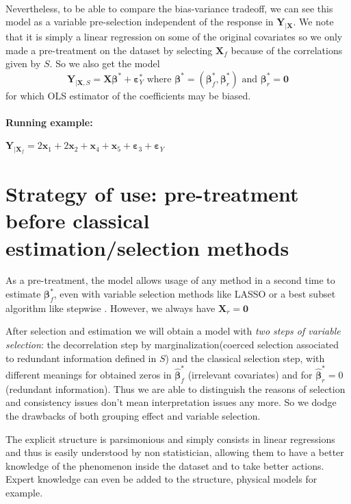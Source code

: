 \documentclass[12pt,a4paper]{report}
\begin{document}
\\
Nevertheless, to be able to compare the bias-variance tradeoff, we can see this model as a variable pre-selection independent of the response in $\boldsymbol{Y}_{|\boldsymbol{X}}$.
We note that it is simply a linear regression on some of the original covariates so we only made a pre-treatment on the dataset by selecting $\boldsymbol{X}_f$ because of the correlations given by $S$. So we also get the model
\begin{equation}
\boldsymbol{Y}_{|\boldsymbol{X},S}=\boldsymbol{X}\boldsymbol{\beta}^*+\boldsymbol{\varepsilon}_Y^* \textrm{ where }\boldsymbol{\beta}^*=(\boldsymbol{\beta}_f^*,\boldsymbol{\beta}_r^*) \textrm{ and } \boldsymbol{\beta}_r^*=\boldsymbol{0}
\end{equation}
	for which OLS estimator of the coefficients may be biased.  

\paragraph{Running example:} $\boldsymbol{Y}_{|\boldsymbol{X}_f}= 2\boldsymbol{x}_1+2\boldsymbol{x}_2+\boldsymbol{x}_4+\boldsymbol{x}_5+\boldsymbol{\varepsilon}_3 +\boldsymbol{\varepsilon}_Y$
\section{Strategy of use: pre-treatment before classical estimation/selection methods}\label{interpretation}

As a pre-treatment, the model allows usage of any method in a second time to estimate $\boldsymbol{\beta}_f^*$, even with variable selection methods like LASSO or a best subset algorithm like stepwise \cite{seber2012linear}. However, we always have $\boldsymbol{X}_r=\boldsymbol{0}$

After selection and estimation we will obtain a model with { \it two steps of variable selection}: the decorrelation step by marginalization(coerced selection associated to redundant information defined in $S$) and the classical selection step, with different meanings for obtained zeros in $\hat{\boldsymbol{\beta}}^*_f$ (irrelevant covariates) and for $\hat{\boldsymbol{\beta}}^*_r=0$ (redundant information). 
 Thus we are able to distinguish the reasons of selection and consistency issues don't mean interpretation issues any more. So we dodge the drawbacks of both grouping effect and variable selection.


The explicit structure is parsimonious and simply consists in linear regressions and thus is easily understood by non statistician, allowing them to have a better knowledge of the phenomenon inside the dataset and to take better actions. Expert knowledge can even be added to the structure, physical models for example.
\end{document}
